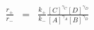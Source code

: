 \begin{eqnarray}
\frac{r_+}{r_-} & = &\frac{k_+}{k_-}\frac{[C]^{\gamma_C}[D]^{\gamma_D}}{[A]^{\gamma_A}[B]^{\gamma_D}} \\
\end{eqnarray}